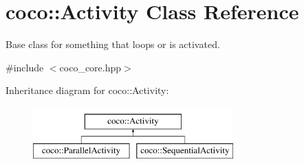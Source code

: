 \hypertarget{classcoco_1_1_activity}{}\section{coco\+:\+:Activity Class Reference}
\label{classcoco_1_1_activity}


Base class for something that loops or is activated.  




{\ttfamily \#include $<$coco\+\_\+core.\+hpp$>$}

Inheritance diagram for coco\+:\+:Activity\+:\begin{figure}[H]
\begin{center}
\leavevmode
\includegraphics[height=2.000000cm]{classcoco_1_1_activity}
\end{center}
\end{figure}

